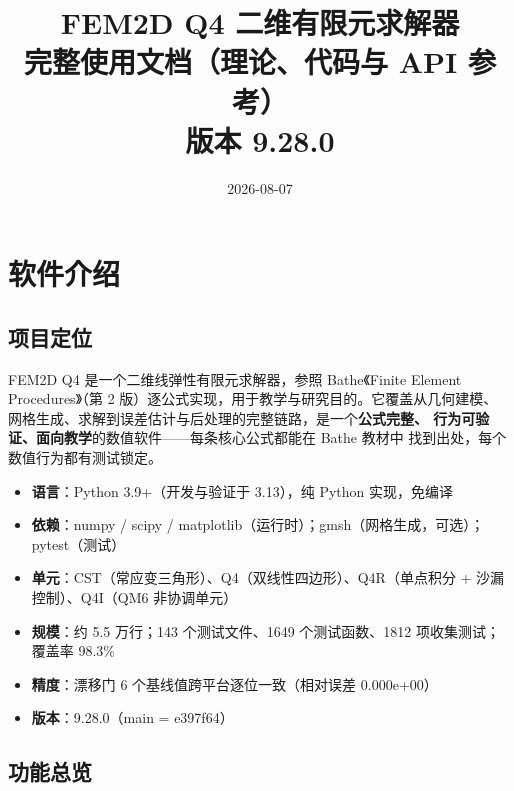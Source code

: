 \documentclass[12pt,a4paper]{ctexart}
\title{\Huge FEM2D Q4 二维有限元求解器\\[6pt]\Large 完整使用文档（理论、代码与 API 参考）\\[4pt]\normalsize 版本 9.28.0}
\author{}
\date{2026-08-07}
\begin{document}
\maketitle
\tableofcontents
\newpage

\section{软件介绍}

\subsection{项目定位}

FEM2D Q4 是一个二维线弹性有限元求解器，参照 Bathe《Finite Element
Procedures》（第 2 版）逐公式实现，用于教学与研究目的。它覆盖从几何建模、
网格生成、求解到误差估计与后处理的完整链路，是一个\textbf{公式完整、
行为可验证、面向教学}的数值软件——每条核心公式都能在 Bathe 教材中
找到出处，每个数值行为都有测试锁定。

\begin{itemize}[leftmargin=*]
  \item \textbf{语言}：Python 3.9+（开发与验证于 3.13），纯 Python 实现，免编译
  \item \textbf{依赖}：numpy / scipy / matplotlib（运行时）；gmsh（网格生成，可选）；pytest（测试）
  \item \textbf{单元}：CST（常应变三角形）、Q4（双线性四边形）、Q4R（单点积分 + 沙漏控制）、Q4I（QM6 非协调单元）
  \item \textbf{规模}：约 5.5 万行；143 个测试文件、1649 个测试函数、1812 项收集测试；覆盖率 98.3\%
  \item \textbf{精度}：漂移门 6 个基线值跨平台逐位一致（相对误差 0.000e+00）
  \item \textbf{版本}：9.28.0（main = e397f64）
\end{itemize}

\subsection{功能总览}
\end{document}
